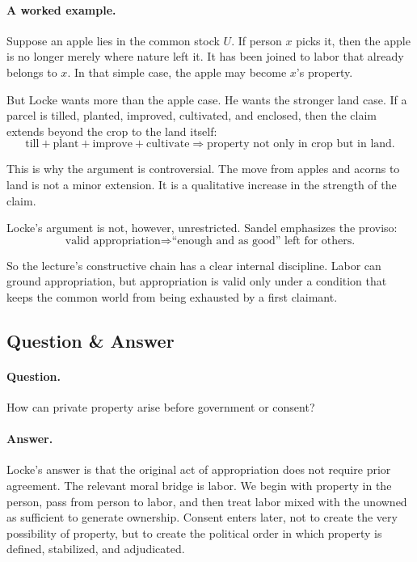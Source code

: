 \paragraph{A worked example.}
Suppose an apple lies in the common stock \(U\). If person \(x\) picks it, then the apple is no longer merely where nature left it. It has been joined to labor that already belongs to \(x\). In that simple case, the apple may become \(x\)'s property.

But Locke wants more than the apple case. He wants the stronger land case. If a parcel is tilled, planted, improved, cultivated, and enclosed, then the claim extends beyond the crop to the land itself:
\begin{equation}
\text{till}+\text{plant}+\text{improve}+\text{cultivate}
\Longrightarrow
\text{property not only in crop but in land}.
\end{equation}

This is why the argument is controversial. The move from apples and acorns to land is not a minor extension. It is a qualitative increase in the strength of the claim.

Locke's argument is not, however, unrestricted. Sandel emphasizes the proviso:
\begin{equation}
\text{valid appropriation}\Longrightarrow \text{``enough and as good'' left for others.}
\end{equation}

So the lecture's constructive chain has a clear internal discipline. Labor can ground appropriation, but appropriation is valid only under a condition that keeps the common world from being exhausted by a first claimant.

\subsection{Question \& Answer}

\paragraph{Question.} How can private property arise before government or consent?

\paragraph{Answer.} Locke's answer is that the original act of appropriation does not require prior agreement. The relevant moral bridge is labor. We begin with property in the person, pass from person to labor, and then treat labor mixed with the unowned as sufficient to generate ownership. Consent enters later, not to create the very possibility of property, but to create the political order in which property is defined, stabilized, and adjudicated.

